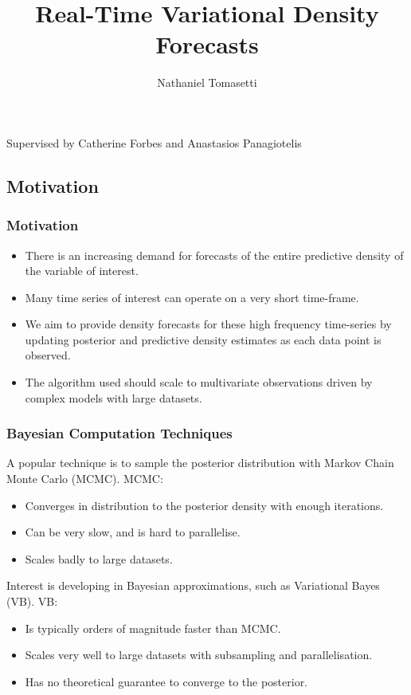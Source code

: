 \documentclass{beamer}\usepackage[]{graphicx}\usepackage[]{color}
\title[Real-Time Variational Density Forecasts]{Real-Time Variational Density Forecasts}
\author[Nathaniel Tomasetti]{Nathaniel Tomasetti}
\date{ }
\begin{document}
\begin{frame}
\titlepage
\centering
Supervised by Catherine Forbes and Anastasios Panagiotelis
\end{frame}


\begin{frame}
\section{Motivation}
\frametitle{Motivation}
\begin{itemize}
\item There is an increasing demand for forecasts of the entire predictive density of the variable of interest.
\item Many time series of interest can operate on a very short time-frame.
\item We aim to provide density forecasts for these high frequency time-series by updating posterior and predictive density estimates as each data point is observed.
\item The algorithm used should scale to multivariate observations driven by complex models with large datasets.
\end{itemize}
\end{frame}


\begin{frame}
\frametitle{Bayesian Computation Techniques}
A popular technique is to sample the posterior distribution with Markov Chain Monte Carlo (MCMC). MCMC:
\begin{itemize}
\item Converges in distribution to the posterior density with enough iterations.
\item Can be very slow, and is hard to parallelise.
\item Scales badly to large datasets.
\end{itemize}
Interest is developing in Bayesian approximations, such as Variational Bayes (VB). VB:
\begin{itemize}
\item Is typically orders of magnitude faster than MCMC.
\item Scales very well to large datasets with subsampling and parallelisation.
\item Has no theoretical guarantee to converge to the posterior.
\end{itemize}
\end{frame}
\end{document}
